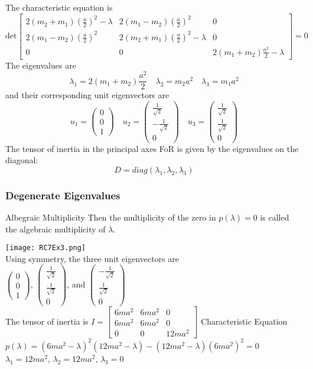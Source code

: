 \begin{frame}
The characteristic equation is
\[\mathrm{det}\left[\begin{matrix}
2(m_2+m_1)(\frac{a}{2})^2-\lambda&2(m_1-m_2)(\frac{a}{2})^2&0\\
2(m_1-m_2)(\frac{a}{2})^2&2(m_2+m_1)(\frac{a}{2})^2-\lambda&0\\
0&0&2(m_1+m_2)\frac{a^2}{2}-\lambda
\end{matrix}\right]=0\]
The eigenvalues are
\[\lambda_1=2(m_1+m_2)\frac{a^2}{2}\quad\lambda_2=m_2a^2\quad\lambda_3=m_1 a^2\]
and their corresponding unit eigenvectors are
\[u_1=\left(\begin{matrix}0\\0\\1\end{matrix}\right)\quad u_2=\left(\begin{matrix}\frac{1}{\sqrt{2}}\\-\frac{1}{\sqrt{2}}\\0\end{matrix}\right)\quad u_3=\left(\begin{matrix}\frac{1}{\sqrt{2}}\\\frac{1}{\sqrt{2}}\\0\end{matrix}\right)\]
The tensor of inertia in the \alert{principal axes FoR} is given by the \alert{eigenvalues} on the diagonal:
\[D=diag(\lambda_1,\lambda_2,\lambda_3)\]
\end{frame}
\begin{frame}
\frametitle{Degenerate Eigenvalues}
\begin{block}{Albegraic Multiplicity}
Then the multiplicity of the zero in $p(\lambda)=0$ is called the \alert{algebraic multiplicity} of $\lambda$.
\end{block}
\begin{multicols}{2}
\texttt{[image: RC7Ex3.png]}\\
Using symmetry, the three unit eigenvectors are \\$\left(\begin{matrix}0\\0\\1\end{matrix}\right)$, $\left(\begin{matrix}\frac{1}{\sqrt{2}}\\\frac{1}{\sqrt{2}}\\0\end{matrix}\right)$, and $\left(\begin{matrix}-\frac{1}{\sqrt{2}}\\\frac{1}{\sqrt{2}}\\0\end{matrix}\right)$\\
The tensor of inertia is
$I=\left[\begin{matrix}6ma^2&6ma^2&0\\6ma^2&6ma^2&0\\0&0&12ma^2\end{matrix}\right]$
Characteristic Equation $p(\lambda)=(6ma^2-\lambda)^2(12ma^2-\lambda)-(12ma^2-\lambda)(6ma^2)^2=0$
$\lambda_1=12ma^2$, $\lambda_2=12ma^2$, $\lambda_3=0$
\end{multicols}
\end{frame}
